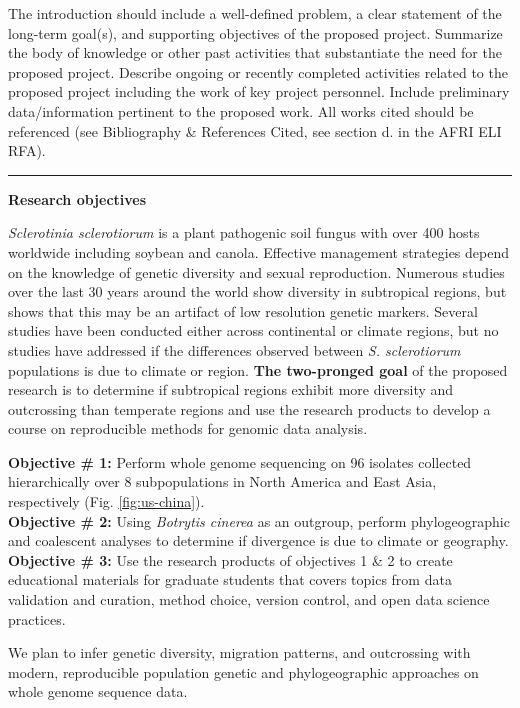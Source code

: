 \documentclass[12pt,letterpaper]{article}
\begin{document}
The introduction should include a well-defined problem, a clear statement of
the long-term goal(s), and supporting objectives of the proposed project.
Summarize the body of knowledge or other past activities that substantiate the
need for the proposed project. Describe ongoing or recently completed
activities related to the proposed project including the work of key project
personnel. Include preliminary data/information pertinent to the proposed
work. All works cited should be referenced (see Bibliography \& References
Cited, see section d. in the AFRI ELI RFA).\\
\rule{\textwidth}{0.5pt}

\noindent \textbf{Research objectives}

\textit{Sclerotinia sclerotiorum} is a plant pathogenic soil fungus with over 400 hosts worldwide including soybean and canola. 
Effective management strategies depend on the knowledge of genetic diversity and sexual reproduction.
Numerous studies over the last 30 years around the world show diversity in subtropical regions, but \cite{lehner2017sclerotinia} shows that this may be an artifact of low resolution genetic markers.
Several studies have been conducted either across continental or climate regions, but no studies have addressed if the differences observed between \textit{S. sclerotiorum} populations is due to climate or region. 
\textbf{The two-pronged goal} of the proposed research is to determine if subtropical regions exhibit more diversity and outcrossing than temperate regions and use the research products to develop a course on reproducible methods for genomic data analysis.

\noindent
\textbf{Objective \# 1:} Perform whole genome sequencing on 96 isolates collected hierarchically over 8 subpopulations in North America and East Asia, respectively (Fig. \ref{fig:us-china}).\\
\textbf{Objective \# 2:} Using \textit{Botrytis cinerea} as an outgroup, perform phylogeographic and coalescent analyses to determine if divergence is due to climate or geography.\\
\textbf{Objective \# 3:} Use the research products of objectives 1 \& 2 to create educational materials for graduate students that covers topics from
data validation and curation, method choice, version control, and open data science practices.

We plan to infer genetic diversity, migration patterns, and outcrossing with modern, reproducible population genetic and phylogeographic approaches on whole genome sequence data. 
\end{document}
